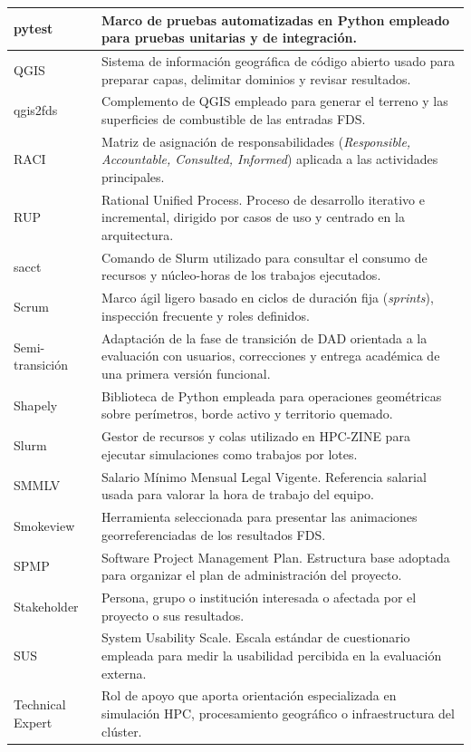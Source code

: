 \begin{longtable}{|p{0.29\dimexpr\linewidth-23pt\relax}|p{0.71\dimexpr\linewidth-23pt\relax}|}
pytest & Marco de pruebas automatizadas en Python empleado para pruebas unitarias y de integración.\\\hline
QGIS & Sistema de información geográfica de código abierto usado para preparar capas, delimitar dominios y revisar resultados.\\\hline
qgis2fds & Complemento de QGIS empleado para generar el terreno y las superficies de combustible de las entradas FDS.\\\hline
RACI & Matriz de asignación de responsabilidades (\emph{Responsible, Accountable, Consulted, Informed}) aplicada a las actividades principales.\\\hline
RUP & Rational Unified Process. Proceso de desarrollo iterativo e incremental, dirigido por casos de uso y centrado en la arquitectura.\\\hline
sacct & Comando de Slurm utilizado para consultar el consumo de recursos y núcleo-horas de los trabajos ejecutados.\\\hline
Scrum & Marco ágil ligero basado en ciclos de duración fija (\emph{sprints}), inspección frecuente y roles definidos.\\\hline
Semi-transición & Adaptación de la fase de transición de DAD orientada a la evaluación con usuarios, correcciones y entrega académica de una primera versión funcional.\\\hline
Shapely & Biblioteca de Python empleada para operaciones geométricas sobre perímetros, borde activo y territorio quemado.\\\hline
Slurm & Gestor de recursos y colas utilizado en HPC-ZINE para ejecutar simulaciones como trabajos por lotes.\\\hline
SMMLV & Salario Mínimo Mensual Legal Vigente. Referencia salarial usada para valorar la hora de trabajo del equipo.\\\hline
Smokeview & Herramienta seleccionada para presentar las animaciones georreferenciadas de los resultados FDS.\\\hline
SPMP & Software Project Management Plan. Estructura base adoptada para organizar el plan de administración del proyecto.\\\hline
Stakeholder & Persona, grupo o institución interesada o afectada por el proyecto o sus resultados.\\\hline
SUS & System Usability Scale. Escala estándar de cuestionario empleada para medir la usabilidad percibida en la evaluación externa.\\\hline
Technical Expert & Rol de apoyo que aporta orientación especializada en simulación HPC, procesamiento geográfico o infraestructura del clúster.\\\hline

\end{longtable}
